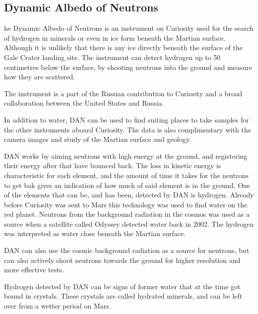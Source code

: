 \subsection*{Dynamic Albedo of Neutrons}
he Dynamic Albedo of Neutrons is an instrument on Curiosity used for the search of hydrogen in minerals or even in ice form beneath the Martian surface.
Although it is unlikely that there is any ice directly beneath the surface of the Gale Crater landing site.
The instrument can detect hydrogen up to 50 centimetres below the surface, by shooting neutrons into the ground and measure how they are scattered.

The instrument is a part of the Russian contribution to Curiosity and a broad collaboration between the United States and Russia.

In addition to water, DAN can be used to find suiting places to take samples for the other instruments aboard Curiosity.
The data is also complimentary with the camera images and study of the Martian surface and geology.

DAN works by aiming neutrons with high energy at the ground, and registering their energy after that have bounced back.
The loss in kinetic energy is characteristic for each element, and the amount of time it takes for the neutrons to get bak gives an indication of how much of said element is in the ground.
One of the elements that can be, and has been, detected by DAN is hydrogen.
Already before Curiosity was sent to Mars this technology was used to find water on the red planet.
Neutrons from the background radiation in the cosmos was used as a source when a satellite called Odyssey detected water back in 2002.
The hydrogen was interpreted as water close beneath the Martian surface.

DAN can also use the cosmic background radiation as a source for neutrons, but can also actively shoot neutrons towards the ground for higher resolution and more effective tests.

Hydrogen detected by DAN can be signs of former water that at the time got bound in crystals.
These crystals are called hydrated minerals, and can be left over from a wetter period on Mars.